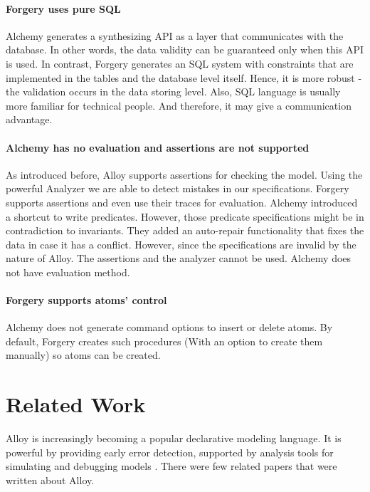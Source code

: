 \documentclass[oneside]{book}
\begin{document}
\subsubsection{Forgery uses pure SQL}
Alchemy generates a synthesizing API as a layer that communicates with the database. In other words, the data validity can be guaranteed only when this API is used. In contrast, Forgery generates an SQL system with constraints that are implemented in the tables and the database level itself. Hence, it is more robust - the validation occurs in the data storing level. Also, SQL language is usually more familiar for technical people. And therefore, it may give a communication advantage.

\subsubsection{Alchemy has no evaluation and assertions are not supported}
As introduced before, Alloy supports assertions for checking the model. Using the powerful Analyzer we are able to detect mistakes in our specifications. Forgery supports assertions and even use their traces for evaluation. Alchemy introduced a shortcut to write predicates. However, those predicate specifications might be in contradiction to invariants. They added an auto-repair functionality that fixes the data in case it has a conflict. However, since the specifications are invalid by the nature of Alloy. The assertions and the analyzer cannot be used. Alchemy does not have evaluation method.

\subsubsection{Forgery supports atoms' control}
Alchemy does not generate command options to insert or delete atoms. By default, Forgery creates such procedures (With an option to create them manually) so atoms can be created.

\newpage

\chapter{Related Work}

Alloy is increasingly becoming a popular declarative modeling language. It is powerful by providing early error detection, supported by analysis tools for simulating and debugging models \cite{lightning}. There were few related papers that were written about Alloy.
\end{document}
